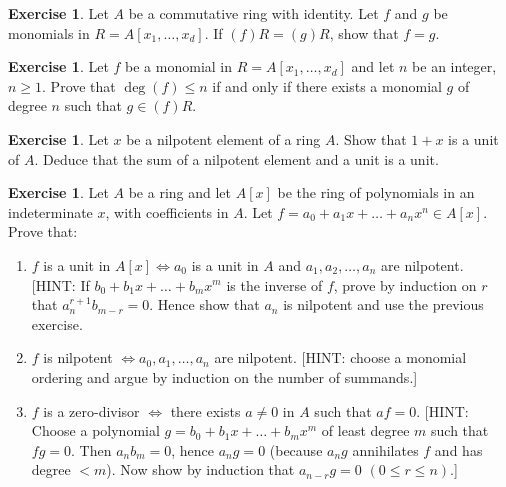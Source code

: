 \documentclass{amsart}
\theoremstyle{plain}
\theoremstyle{definition}
\newtheorem{exercise}[theorem]{Exercise}
\theoremstyle{definition}
\begin{document}
\begin{exercise} %
Let $A$ be a commutative ring with identity.
Let $f$ and $g$ be monomials in $R=A[x_1,\ldots,x_d]$.  If
$(f)R=(g)R$, show that $f=g$.
\end{exercise}


\begin{exercise} %
Let $f$ be a monomial in $R=A[x_1,\dots,x_d]$ and let $n$ be an integer, $n \geq 1$.
Prove that $\deg(f) \leq n$ if and only if there exists a monomial $g$
of degree $n$ such that $g \in (f)R$.
\end{exercise}



\begin{exercise}  Let $x$ be a nilpotent element of a ring $A$.  Show that $1+x$ is a unit of $A$.  Deduce that the sum of a nilpotent element and a unit is a unit.
\end{exercise}

\begin{exercise} %
\label{polyring} Let $A$ be a ring and let $A[x]$ be the ring of polynomials in an indeterminate $x$, with coefficients in $A$.  Let $f = a_0 + a_1x + \dots + a_nx^n \in A[x]$.  Prove that:

\begin{enumerate} \item $f$ is a unit in $A[x] \Leftrightarrow a_0$ is a unit in $A$ and $a_1, a_2, \dots, a_n$ are nilpotent.  [HINT: If $b_0 + b_1x + \dots + b_mx^m$ is the inverse of $f$, prove by induction on $r$ that $a_n^{r+1}b_{m-r} = 0$.  Hence show that  $a_n$ is nilpotent and use the previous exercise.

\item $f$ is nilpotent $\Leftrightarrow a_0, a_1, \dots, a_n$ are nilpotent. [HINT: choose a monomial ordering and argue by induction on the number of summands.] 

\item $f$ is a zero-divisor $\Leftrightarrow$ there exists $a \neq 0$ in $A$ such that $af = 0$.  [HINT: Choose a polynomial $g = b_0 + b_1x + \dots + b_mx^m$ of least degree $m$ such that $fg = 0$.  Then $a_nb_m = 0$, hence $a_ng = 0$ (because $a_ng$ annihilates $f$ and has degree $<m$).  Now show by induction that $a_{n-r}g = 0$  $(0 \leq r \leq n)$.]

\end{enumerate}

\end{exercise} 
\end{document}
